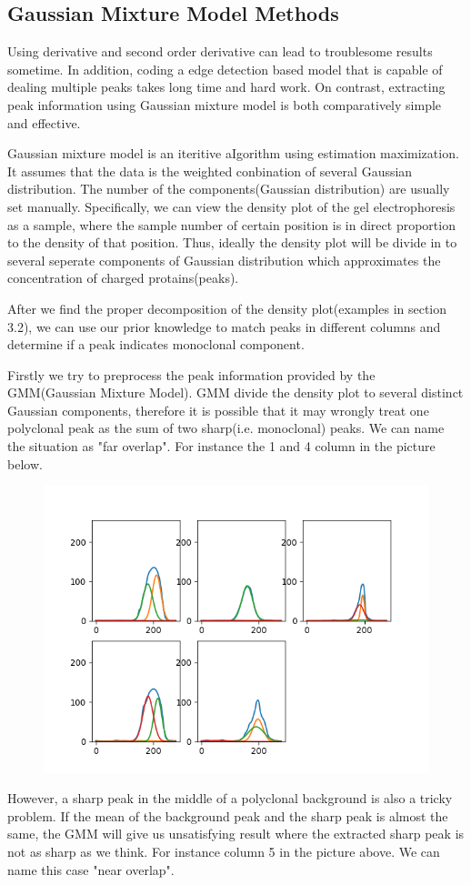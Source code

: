 \documentclass[12pt]{ctexart}
\begin{document}
\subsection{Gaussian Mixture Model Methods}
\par Using derivative and second order derivative can lead to troublesome results sometime. In addition, coding a edge detection based model that is capable of dealing multiple peaks takes long time and hard work. On contrast, extracting peak information using Gaussian mixture model is both comparatively simple and effective.
\par Gaussian mixture model is an iteritive aIgorithm using estimation maximization. It assumes that the data is the weighted conbination of several Gaussian distribution. The number of the components(Gaussian distribution) are usually set manually. Specifically, we can view the density plot of the gel electrophoresis as a sample, where the sample number of certain position is in direct proportion to the density of that position. Thus, ideally the density plot will be divide in to several seperate components of Gaussian distribution which approximates the concentration of charged protains(peaks).
\par After we find the proper decomposition of the density plot(examples in section 3.2), we can use our prior knowledge to match peaks in different columns and determine if a peak indicates monoclonal component.
\par Firstly we try to preprocess the peak information provided by the GMM(Gaussian Mixture Model). GMM divide the density plot to several distinct Gaussian components, therefore it is possible that it may wrongly treat one polyclonal peak as the sum of two sharp(i.e. monoclonal) peaks. We can name the situation as "far overlap". For instance the 1 and 4 column in the picture below.
\begin{figure}[H]
    \centering
    \includegraphics[width=0.5\linewidth]{f.png}
\end{figure}
\par However, a sharp peak in the middle of a polyclonal background is also a tricky problem. If the mean of the background peak and the sharp peak is almost the same, the GMM will give us unsatisfying result where the extracted sharp peak is not as sharp as we think. For instance column 5 in the picture above. We can name this case "near overlap".
\end{document}
